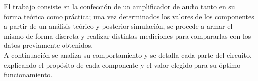 

	El trabajo consiste en la confección de un amplificador de audio tanto en su forma teórica como práctica; una vez determinados los valores de los componentes a partir de un análisis teórico y posterior simulación, se procede a armar el mismo de forma discreta y realizar distintas mediciones para compararlas con los datos previamente obtenidos. \\ 

	A continuación se analiza su comportamiento y se detalla cada parte del circuito, explicando el propósito de cada componente y el valor elegido para su óptimo funcionamiento.
